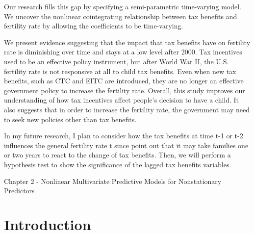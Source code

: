 \documentclass[12pt,a4paper]{article}
\begin{document}
Our research fills this gap by specifying a semi-parametric time-varying model. We uncover the nonlinear cointegrating relationship between tax benefits and fertility rate by allowing the coefficients to be time-varying.

We present evidence suggesting that the impact that tax benefits have on fertility rate is diminishing over time and stays at a low level after 2000. Tax incentives used to be an effective policy instrument, but after World War II, the U.S. fertility rate is not responsive at all to child tax benefits. Even when new tax benefits, such as CTC and EITC are introduced, they are no longer an effective government policy to increase the fertility rate. Overall, this study improves our understanding of how tax incentives affect people's decision to have a child. It also suggests that in order to increase the fertility rate, the government may need to seek new policies other than tax benefits. 

In my future research, I plan to consider how the tax benefits at time t-1 or t-2 influences the general fertility rate t since \cite{whittington1990fertility} point out that it may take families one or two years to react to the change of tax benefits. Then, we will perform a hypothesis test to show the significance of the lagged tax benefits variables.




\pagebreak



{\LARGE Chapter 2 - Nonlinear Multivariate Predictive Models for Nonstationary Predictors}
\setcounter{section}{0}
\section{Introduction}
\end{document}
